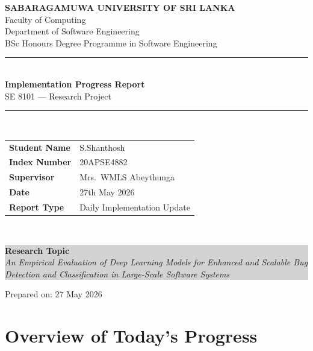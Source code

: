 \documentclass[12pt,a4paper]{article}
\begin{document}
\begin{titlepage}
  \centering
  \vspace*{1cm}
  {\Large\bfseries SABARAGAMUWA UNIVERSITY OF SRI LANKA\\[0.3cm]}
  {\large Faculty of Computing\\
          Department of Software Engineering\\[0.5cm]}
  {\normalsize BSc Honours Degree Programme in Software Engineering\\[2cm]}

  \rule{\linewidth}{1.5pt}\\[0.4cm]
  {\LARGE\bfseries\color{suslblue}
    Implementation Progress Report\\[0.2cm]}
  {\large SE 8101 --- Research Project\\[0.3cm]}
  \rule{\linewidth}{1.5pt}\\[1.5cm]

  \begin{tabular}{ll}
    \textbf{Student Name}   & S.Shanthosh \\[0.3cm]
    \textbf{Index Number}   & 20APSE4882  \\[0.3cm]
    \textbf{Supervisor}     & Mrs.\ WMLS Abeythunga \\[0.3cm]
    \textbf{Date}           & 27th May 2026 \\[0.3cm]
    \textbf{Report Type}    & Daily Implementation Update \\
  \end{tabular}\\[2cm]

  \colorbox{lightgray}{\parbox{0.9\linewidth}{
    \centering\vspace{0.3cm}
    {\bfseries Research Topic}\\[0.2cm]
    \textit{An Empirical Evaluation of Deep Learning Models for Enhanced and
    Scalable Bug Detection and Classification in Large-Scale Software Systems}
    \vspace{0.3cm}
  }}

  \vfill
  {\small Prepared on: 27 May 2026}
\end{titlepage}

\tableofcontents
\newpage

\section{Overview of Today's Progress}
\end{document}
